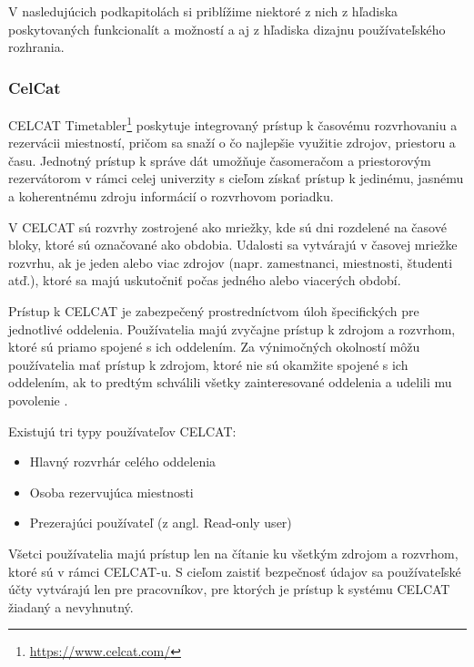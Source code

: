 V nasledujúcich podkapitolách si priblížime niektoré z nich z hľadiska poskytovaných funkcionalít
a možností a aj z hľadiska dizajnu používateľského rozhrania.

\subsubsection{CelCat}
\label{subsubsec:celcat}

CELCAT Timetabler\footnote{\url{ https://www.celcat.com/}} poskytuje integrovaný prístup k časovému
rozvrhovaniu a rezervácii miestností, pričom sa snaží o čo najlepšie využitie zdrojov, priestoru a času.
Jednotný prístup k správe dát umožňuje časomeračom a priestorovým rezervátorom v rámci celej univerzity
s cieľom získať prístup k jedinému, jasnému a koherentnému zdroju informácií o rozvrhovom poriadku.

V CELCAT sú rozvrhy zostrojené ako mriežky, kde sú dni rozdelené na časové bloky, ktoré sú označované
ako obdobia. Udalosti sa vytvárajú v časovej mriežke rozvrhu, ak je jeden alebo viac zdrojov
(napr. zamestnanci, miestnosti, študenti atď.), ktoré sa majú uskutočniť počas jedného alebo viacerých období.

Prístup k CELCAT je zabezpečený prostredníctvom úloh špecifických pre jednotlivé oddelenia. Používatelia majú
zvyčajne prístup k zdrojom a rozvrhom, ktoré sú priamo spojené s ich oddelením. Za výnimočných okolností
môžu používatelia mať prístup k zdrojom, ktoré nie sú okamžite spojené s ich oddelením, ak to predtým
schválili všetky zainteresované oddelenia a udelili mu povolenie \cite{celcat}.

Existujú tri typy používateľov CELCAT:
\begin{itemize}
\item Hlavný rozvrhár celého oddelenia
\item Osoba rezervujúca miestnosti
\item Prezerajúci používateľ (z angl. Read-only user)
\end{itemize}

Všetci používatelia majú prístup len na čítanie ku všetkým zdrojom a rozvrhom, ktoré sú v rámci CELCAT-u.
S cieľom zaistiť bezpečnosť údajov sa používateľské účty vytvárajú len pre pracovníkov, pre ktorých je prístup
k systému CELCAT žiadaný a nevyhnutný.

